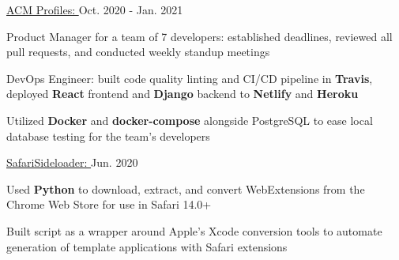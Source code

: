
\begin{cventries}

  \cvproject
  {\href{https://elated-pike-6f8e56.netlify.app/}{ACM Profiles: }} %
  {Oct. 2020 - Jan. 2021} %
  {
    \begin{cvitems} %
      \item {Product Manager for a team of 7 developers: established deadlines, reviewed all pull requests, and conducted weekly standup meetings}
      \item {DevOps Engineer: built code quality linting and CI/CD pipeline in \textbf{Travis}, deployed \textbf{React} frontend and \textbf{Django} backend to \textbf{Netlify} and \textbf{Heroku}}
      \item {Utilized \textbf{Docker} and \textbf{docker-compose} alongside PostgreSQL to ease local database testing for the team's developers}
    \end{cvitems}
  }

  \cvproject
    {\href{https://github.com/hexalellogram/SafariSideloader}{SafariSideloader: }} %
    {Jun. 2020} %
    {
      \begin{cvitems} %
        \item {Used \textbf{Python} to download, extract, and convert WebExtensions from the Chrome Web Store for use in Safari 14.0+}
        \item {Built script as a wrapper around Apple's Xcode conversion tools to automate generation of template applications with Safari extensions}
      \end{cvitems}
    }


\end{cventries}
